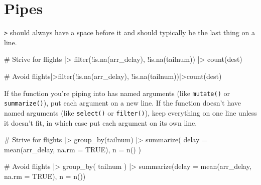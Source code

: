 \documentclass[
  letterpaper,
  DIV=11,
  numbers=noendperiod]{scrreprt}
\newenvironment{Shaded}{\begin{snugshade}}{\end{snugshade}}
\newcommand{\AttributeTok}[1]{\textcolor[rgb]{0.40,0.45,0.13}{#1}}
\newcommand{\CommentTok}[1]{\textcolor[rgb]{0.37,0.37,0.37}{#1}}
\newcommand{\ConstantTok}[1]{\textcolor[rgb]{0.56,0.35,0.01}{#1}}
\newcommand{\FunctionTok}[1]{\textcolor[rgb]{0.28,0.35,0.67}{#1}}
\newcommand{\NormalTok}[1]{\textcolor[rgb]{0.00,0.23,0.31}{#1}}
\newcommand{\SpecialCharTok}[1]{\textcolor[rgb]{0.37,0.37,0.37}{#1}}
\begin{document}
\section{Pipes}\label{pipes}

\texttt{\textbar{}\textgreater{}} should always have a space before it
and should typically be the last thing on a line.

\begin{Shaded}
\begin{Highlighting}[]
\CommentTok{\# Strive for}
\NormalTok{flights }\SpecialCharTok{|\textgreater{}}
  \FunctionTok{filter}\NormalTok{(}\SpecialCharTok{!}\FunctionTok{is.na}\NormalTok{(arr\_delay), }\SpecialCharTok{!}\FunctionTok{is.na}\NormalTok{(tailnum)) }\SpecialCharTok{|\textgreater{}}
  \FunctionTok{count}\NormalTok{(dest)}

\CommentTok{\# Avoid}
\NormalTok{flights}\SpecialCharTok{|\textgreater{}}\FunctionTok{filter}\NormalTok{(}\SpecialCharTok{!}\FunctionTok{is.na}\NormalTok{(arr\_delay), }\SpecialCharTok{!}\FunctionTok{is.na}\NormalTok{(tailnum))}\SpecialCharTok{|\textgreater{}}\FunctionTok{count}\NormalTok{(dest)}
\end{Highlighting}
\end{Shaded}

If the function you're piping into has named arguments (like
\texttt{mutate()} or \texttt{summarize()}), put each argument on a new
line. If the function doesn't have named arguments (like
\texttt{select()} or \texttt{filter()}), keep everything on one line
unless it doesn't fit, in which case put each argument on its own line.

\begin{Shaded}
\begin{Highlighting}[]
\CommentTok{\# Strive for}
\NormalTok{flights }\SpecialCharTok{|\textgreater{}}
  \FunctionTok{group\_by}\NormalTok{(tailnum) }\SpecialCharTok{|\textgreater{}}
  \FunctionTok{summarize}\NormalTok{(}
    \AttributeTok{delay =} \FunctionTok{mean}\NormalTok{(arr\_delay, }\AttributeTok{na.rm =} \ConstantTok{TRUE}\NormalTok{),}
    \AttributeTok{n =} \FunctionTok{n}\NormalTok{()}
\NormalTok{  )}

\CommentTok{\# Avoid}
\NormalTok{flights }\SpecialCharTok{|\textgreater{}}
  \FunctionTok{group\_by}\NormalTok{(}
\NormalTok{    tailnum}
\NormalTok{  ) }\SpecialCharTok{|\textgreater{}}
  \FunctionTok{summarize}\NormalTok{(}\AttributeTok{delay =} \FunctionTok{mean}\NormalTok{(arr\_delay, }\AttributeTok{na.rm =} \ConstantTok{TRUE}\NormalTok{), }\AttributeTok{n =} \FunctionTok{n}\NormalTok{())}
\end{Highlighting}
\end{Shaded}
\end{document}
